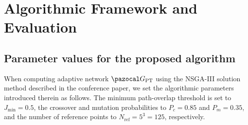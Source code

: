 \documentclass[a4paper,fleqn]{cas-sc}
\begin{document}

\section{Algorithmic Framework and Evaluation}
\label{sec:algorithmic-framework-and-evaluation}

\subsection{Parameter values for the proposed algorithm}
When computing adaptive network $\pazocal G_\text{PT}$ using the NSGA-III solution method described in the conference paper, we set the algorithmic parameters introduced therein as follows. 
The minimum path-overlap threshold is set to $J_{\text{min}}=0.5$, the crossover and mutation probabilities to $P_c=0.85$ and $P_m=0.35$, and the number of reference points to $N_{\text{ref}}=5^3=125$, respectively. 
\end{document}
